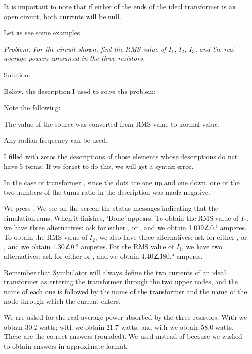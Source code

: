 It is important to note that if either of the ends of the ideal
transformer is an open circuit, both currents will be null.

Let us see some examples.


\emph{Problem: For the circuit shown, find the RMS value of $I_1$,
$I_2$, $I_3$, and the real average powers consumed in the three
resistors.}

Solution:

Below, the description I used to solve the problem:


Note the following:

The value of the source was converted from RMS value to normal
value.

Any radian frequency can be used.

I filled with zeros the descriptions of those elements whose
descriptions do not have 5 terms. If we forget to do this, we will
get a syntax error.

In the case of transformer , since the dots are one up and
one down, one of the two numbers of the turns ratio in the
description was made negative.

We press . We see on the screen the status messages
indicating that the simulation runs. When it finishes, `Done'
appears. To obtain the RMS value of $I_1$, we have three
alternatives: ask for either ,
 or , and we obtain
1.099∠0.° amperes. To obtain the RMS value of $I_2$, we also have
three alternatives: ask for either ,
 or , and we obtain
1.30∠0.° amperes. For the RMS value of $I_3$, we have two
alternatives: ask for either  or
, and we obtain 4.40∠180.° amperes.

Remember that Symbulator will always define the two currents of an
ideal transformer as entering the transformer through the two upper
nodes, and the name of each one is  followed by the name of
the transformer and the name of the node through which the current
enters.

We are asked for the real average power absorbed by the three
resistors. With  we obtain 30.2 watts; with
 we obtain 21.7 watts; and with
 we obtain 58.0 watts. These are the correct
answers (rounded). We used  instead of  because
we wished to obtain answers in approximate format.

